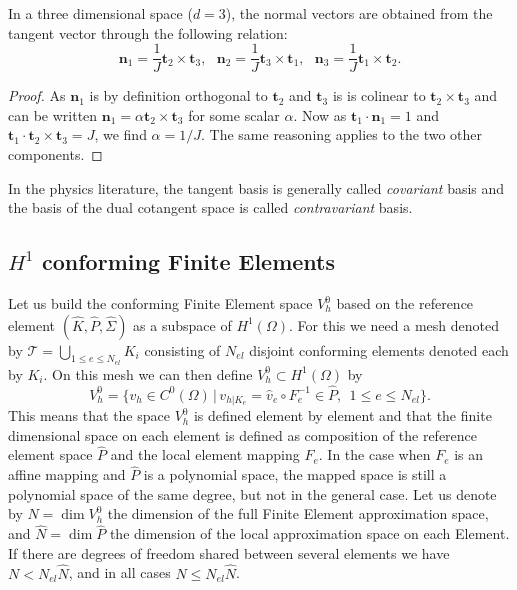 \begin{proposition}
In a three dimensional space ($d=3$), the normal vectors are obtained from the tangent vector through the following relation:
$$ \mathbf{n}_1= \frac 1J \mathbf{t}_2\times \mathbf{t}_3, ~~~  \mathbf{n}_2= \frac 1J \mathbf{t}_3\times \mathbf{t}_1, ~~~ \mathbf{n}_3= \frac 1J \mathbf{t}_1\times \mathbf{t}_2.$$
\end{proposition}
\begin{proof}
As $ \mathbf{n}_1$ is by definition orthogonal to $ \mathbf{t}_2$ and  $ \mathbf{t}_3$ is is colinear to
$\mathbf{t}_2\times \mathbf{t}_3$ and can be written $ \mathbf{n}_1 = \alpha \mathbf{t}_2\times \mathbf{t}_3$ for some scalar $\alpha$. Now as $ \mathbf{t}_1 \cdot \mathbf{n}_1=1$ and
$ \mathbf{t}_1\cdot  \mathbf{t}_2\times \mathbf{t}_3 = J$, we find $\alpha= 1/J$.
The same reasoning  applies to the two other components. 
\end{proof}


\begin{remark}
In the physics literature, the tangent basis is generally called \emph{covariant} basis and the basis of the dual cotangent space is called \emph{contravariant} basis.
\end{remark}



\subsection{$H^1$ conforming Finite Elements}

Let us build the conforming Finite Element space $V^0_h$ based on the reference element $(\hat{K},\hat{P},\hat{\Sigma})$ as a subspace of $ H^1(\Omega)$. For this we need a mesh denoted by 
$\mathcal{T}=\bigcup_{1\leq e \leq N_{el}} K_i$ 
consisting of $N_{el}$ disjoint conforming elements denoted each by $K_i$.
On this mesh we can then define $V^0_h \subset H^1(\Omega)$ by
$$V^0_h = \{ v_h\in C^0( \Omega) \,|\, v_{h|K_e}= \hat{v}_e \circ F_e^{-1} \in \hat{P}, ~~ 1\leq e\leq N_{el}  \}.$$
This means that the space $V^0_h$ is defined element by element and that the finite dimensional space on each element is defined as composition of the reference element space $\hat{P}$ and the local element mapping $F_e$. In the case when $F_e$ is an affine mapping and $\hat{P}$ is a polynomial space, the mapped space is still a polynomial space of the same degree, but not in the general case. Let us denote by $N=\dim V^0_h$ the dimension of the full Finite Element approximation space, and $\hat{N}=\dim \hat{P}$ the dimension of the local approximation space on each Element. If there are degrees of freedom shared between several elements we have $N< N_{el} \hat{N}$, and in all cases $N\leq N_{el} \hat{N}$.

